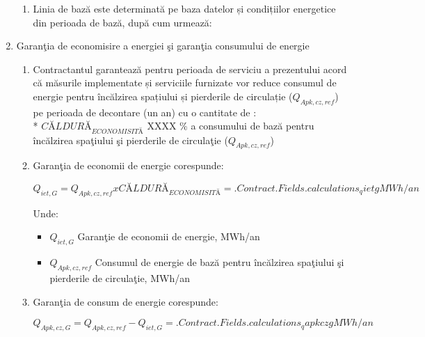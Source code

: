 \begin{enumerate}
    \begin{enumerate}
	\item Linia de bază este determinată pe baza datelor și condițiilor energetice din perioada de bază, după cum urmează:
    \end{enumerate}


    \begin{center}
\end{center}

  \item Garanţia de economisire a energiei şi garanţia consumului de energie

    \begin{enumerate}
	\item Contractantul garantează pentru perioada de serviciu a prezentului acord că măsurile implementate și serviciile furnizate vor reduce consumul de energie pentru încălzirea spațiului și pierderile de circulație ($Q_{Apk, cz, ref}$) pe perioada de decontare (un an) cu o cantitate de :\\*
 $CĂLDURĂ_{ECONOMISITĂ}$ XXXX \%  a consumului de bază pentru încălzirea spaţiului şi pierderile de circulaţie ($Q_{Apk, cz, ref}$)
	\item Garanţia de economii de energie corespunde:

          \[Q_{iet,G} = Q_{Apk, cz, ref} x CĂLDURĂ_{ECONOMISITĂ} = {{.Contract.Fields.calculations_qietg}} MWh/an\]

          Unde:
          \begin{itemize}[label={}]
	\item $Q_{iet, G}$ \quad \quad \quad   Garanţie de economii de energie, MWh/an
	\item $Q_{Apk, cz, ref}$ \quad Consumul de energie de bază pentru încălzirea spaţiului şi pierderile de circulaţie, MWh/an
	  \end{itemize}

        \item Garanţia de consum de energie corespunde:

          \[Q_{Apk,cz,G} = Q_{Apk,cz,ref} - Q_{iet,G} = {{.Contract.Fields.calculations_qapkczg}} MWh/an\]


\end{enumerate}
\end{enumerate}
